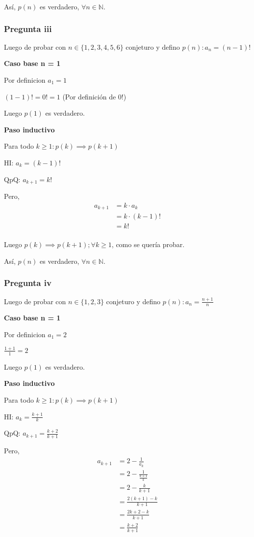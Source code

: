 Así, $p(n)$ es verdadero, $\forall n \in \mathbb{N}$.

\subsubsection{Pregunta iii}

Luego de probar con $ n \in \{ 1,2,3,4,5,6 \} $ conjeturo y defino $ p(n): a_n = (n-1)! $

\textbf{Caso base n = 1}

Por definicion $ a_1 = 1$

$ (1-1)! = 0! = 1$ (Por definición de 0!)

Luego $ p(1) $ es verdadero.

\textbf{Paso inductivo}

Para todo $k \geq 1: p(k) \implies p(k+1)$

HI: $ a_k = (k-1)!$

QpQ: $ a_{k+1} = k!$

Pero,
\begin{align*}
    a_{k+1} &= k\cdot a_k \\
    &= k\cdot (k-1)! \\
    &= k! \\
\end{align*}

Luego $p(k) \implies p(k+1); \forall k \geq 1$, como se quería probar.

Así, $p(n)$ es verdadero, $\forall n \in \mathbb{N}$.

\subsubsection{Pregunta iv}

Luego de probar con $ n \in \{ 1,2,3 \} $ conjeturo y defino $ p(n): a_n = \frac{n+1}{n} $

\textbf{Caso base n = 1}

Por definicion $ a_1 = 2$

$ \frac{1+1}{1} = 2 $

Luego $ p(1) $ es verdadero.

\textbf{Paso inductivo}

Para todo $k \geq 1: p(k) \implies p(k+1)$

HI: $ a_k = \frac{k+1}{k}$

QpQ: $ a_{k+1} = \frac{k+2}{k+1}$

Pero,
\begin{align*}
    a_{k+1} &= 2-\frac{1}{a_k} \\ 
    &= 2-\frac{1}{\frac{k+1}{k}} \\ 
    &= 2-\frac{k}{k+1} \\
    &= \frac{2(k+1)-k}{k+1} \\
    &= \frac{2k+2-k}{k+1} \\
    &= \frac{k+2}{k+1} \\
\end{align*}

